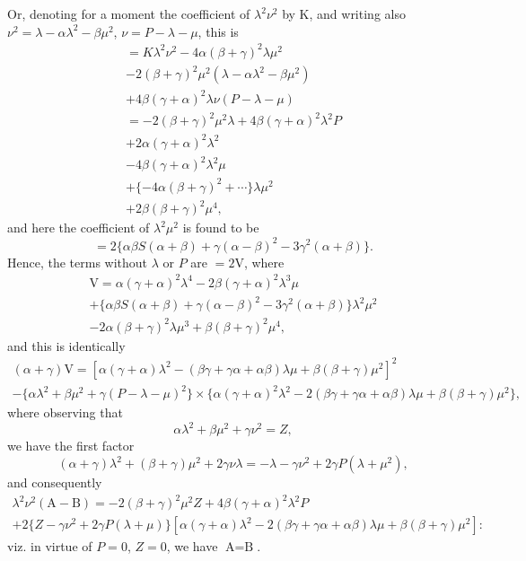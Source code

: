 \documentclass[12pt,a4paper]{article}
\theoremstyle{plain}
\begin{document}
Or, denoting for a moment the coefficient of $\lambda^{2}\nu^{2}$ by K, and writing also $\nu^{2} = \lambda - \alpha\lambda^{2} - \beta\mu^{2}$, $\nu = P - \lambda - \mu$, this is
%
\begin{multline}
= K\lambda^{2}\nu^{2} - 4\alpha(\beta + \gamma)^{2}\lambda\mu^{2} \\
- 2(\beta + \gamma)^{2}\mu^{2}(\lambda - \alpha\lambda^{2} - \beta\mu^{2}) \\
+ 4\beta(\gamma + \alpha)^{2}\lambda\nu(P - \lambda - \mu) \\
= -2(\beta + \gamma)^{2}\mu^{2}\lambda + 4\beta(\gamma + \alpha)^{2}\lambda^{2}P \\
+ 2\alpha(\gamma + \alpha)^{2}\lambda^{2} \\
- 4\beta(\gamma + \alpha)^{2}\lambda^{2}\mu \\
+ \{-4\alpha(\beta + \gamma)^{2} + \cdots\}\lambda\mu^{2} \\
+ 2\beta(\beta + \gamma)^{2}\mu^{4},
\end{multline}
%
and here the coefficient of $\lambda^{2}\mu^{2}$ is found to be
\[
= 2\{\alpha\beta S(\alpha + \beta) + \gamma(\alpha - \beta)^{2} - 3\gamma^{2}(\alpha + \beta)\}.
\]
Hence, the terms without $\lambda$ or $P$ are $= 2\text{V}$, where
%
\begin{multline}
\text{V} = \alpha(\gamma + \alpha)^{2}\lambda^{4} - 2\beta(\gamma + \alpha)^{2}\lambda^{3}\mu \\
+ \{\alpha\beta S(\alpha + \beta) + \gamma(\alpha - \beta)^{2} - 3\gamma^{2}(\alpha + \beta)\}\lambda^{2}\mu^{2} \\
- 2\alpha(\beta + \gamma)^{2}\lambda\mu^{3} + \beta(\beta + \gamma)^{2}\mu^{4},
\end{multline}
%
and this is identically
%
\begin{multline}
(\alpha + \gamma)\text{V} = [\alpha(\gamma + \alpha)\lambda^{2} - (\beta\gamma + \gamma\alpha + \alpha\beta)\lambda\mu + \beta(\beta + \gamma)\mu^{2}]^{2} \\
- \{\alpha\lambda^{2} + \beta\mu^{2} + \gamma(P - \lambda - \mu)^{2}\}\times\{
\alpha(\gamma + \alpha)^{2}\lambda^{2} - 2(\beta\gamma + \gamma\alpha + \alpha\beta)\lambda\mu + \beta(\beta + \gamma)\mu^{2}\},
\end{multline}
%
where observing that
\[
\alpha\lambda^{2} + \beta\mu^{2} + \gamma\nu^{2} = Z,
\]
we have the first factor
\[
(\alpha + \gamma)\lambda^{2} + (\beta + \gamma)\mu^{2} + 2\gamma\nu\lambda = -\lambda - \gamma\nu^{2} + 2\gamma P(\lambda + \mu^{2}),
\]
and consequently
%
\begin{multline}
\lambda^{2}\nu^{2}(\text{A} - \text{B}) = -2(\beta + \gamma)^{2}\mu^{2}Z + 4\beta(\gamma + \alpha)^{2}\lambda^{2}P \\
+ 2\{Z - \gamma\nu^{2} + 2\gamma P(\lambda + \mu)\}[\alpha(\gamma + \alpha)\lambda^{2} - 2(\beta\gamma + \gamma\alpha + \alpha\beta)\lambda\mu + \beta(\beta + \gamma)\mu^{2}]:
\end{multline}
%
viz. in virtue of $P=0$, $Z=0$, we have $\text{A} = \text{B}$.
\end{document}
